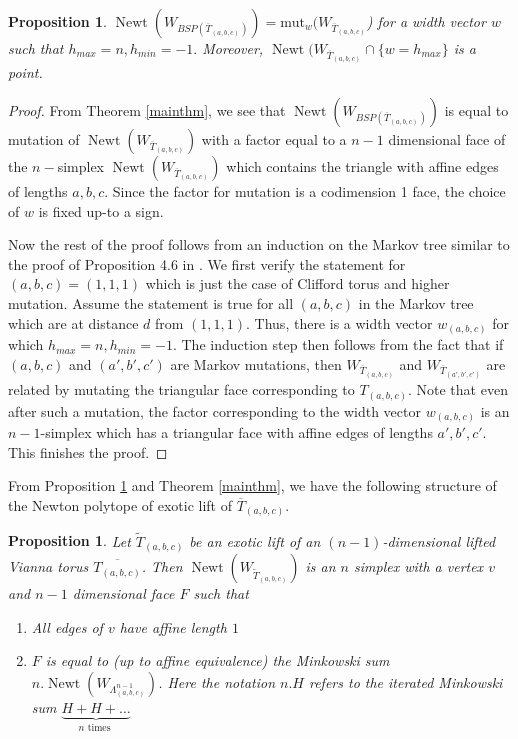 \documentclass[11pt, oneside,dvipsnames]{amsart}
\newcommand{\wt}{\widetilde}
\newcommand{\<}{\langle}
\renewcommand{\>}{\rangle}
\DeclareMathOperator{\newt}{Newt}
\newcommand{\abc}{{(a,b,c)}}
\newtheorem{prop}[Theorem]{Proposition}
\theoremstyle{definition}
\theoremstyle{definition}
\numberwithin{equation}{subsection}
\begin{document}
\begin{prop}\label{prop:newtstruct}
    $\newt(W_{BSP(\overline{T}_\abc)}) = \text{mut}_w({W_{\overline{T}_\abc}}$) for a width vector $w$ such that $h_{max}=n,h_{min}=-1.$ Moreover, $\newt(W_{\overline{T}_\abc} \cap \{ w = h_{max} \}$ is a point.
\end{prop}
\begin{proof}
    
From Theorem \ref{mainthm}, we see that $\newt(W_{BSP(\overline{T}_\abc)})$ is equal to mutation of $\newt(W_{\overline{T}_\abc})$ with a factor equal to a $n-1$ dimensional face of the $n-$simplex $\newt(W_{\overline{T}_\abc})$ which contains the triangle with affine edges of lengths $a,b,c.$ Since the factor for mutation is a codimension 1 face, the choice of $w$ is fixed up-to a sign. 

Now the rest of the proof follows from an induction on the Markov tree similar to the proof of Proposition 4.6 in \cite{chw}.   We first verify the statement for $\abc = (1,1,1)$ which is just the case of Clifford torus and higher mutation. Assume the statement is true for all $(a,b,c)$ in the Markov tree which are at distance $d$ from $(1,1,1)$. Thus, there is a width vector $w_\abc$ for which $h_{max}=n, h_{min}=-1.$ The induction step then follows from the fact that if $\abc$ and $(a',b',c')$ are Markov mutations, then $W_{\overline{T}_\abc}$ and $W_{\overline{T}_{(a',b',c')}}$ are related by mutating the triangular face corresponding to $T_\abc$. Note that even after such a mutation, the factor corresponding to the width vector $w_\abc$ is an $n-1$-simplex which has a triangular face with affine edges of lengths $a',b',c'.$ This finishes the proof.
\end{proof}

From Proposition \ref{prop:newtstruct} and Theorem \ref{mainthm}, we have the following structure of the Newton polytope of exotic lift of $\overline{T}_\abc$.

\begin{prop}\label{newpolytopes}
    Let $\wt T_\abc$ be an exotic lift of an $(n-1)$-dimensional lifted Vianna torus $\overline{T_\abc}$. Then $\newt(W_{\wt T_\abc})$ is an $n$ simplex with a vertex $v$ and $n-1$ dimensional face $F$ such that
    \begin{enumerate}
        \item All edges of $v$ have affine length $1$
        \item $F$ is equal to (up to affine equivalence) the Minkowski sum $n.\newt(W_{\Lambda^{n-1}_\abc})$. Here the notation $n.H$ refers to the iterated Minkowski sum $\underbrace{H + H + \dots}_{n \text{ times }}$
    \end{enumerate}
\end{prop}
\end{document}
